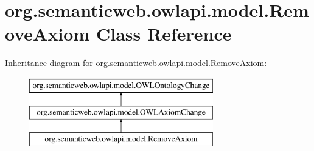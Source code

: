 \hypertarget{classorg_1_1semanticweb_1_1owlapi_1_1model_1_1_remove_axiom}{\section{org.\-semanticweb.\-owlapi.\-model.\-Remove\-Axiom Class Reference}
\label{classorg_1_1semanticweb_1_1owlapi_1_1model_1_1_remove_axiom}
}
Inheritance diagram for org.\-semanticweb.\-owlapi.\-model.\-Remove\-Axiom\-:\begin{figure}[H]
\begin{center}
\leavevmode
\includegraphics[height=3.000000cm]{classorg_1_1semanticweb_1_1owlapi_1_1model_1_1_remove_axiom}
\end{center}
\end{figure}
